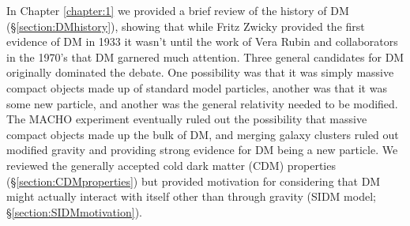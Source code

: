 In Chapter \ref{chapter:1} we provided a brief review of the history of DM (\S\ref{section:DMhistory}), showing that while Fritz Zwicky provided the first evidence of DM in 1933 \citep{Zwicky:1933ub} it wasn't until the work of Vera Rubin and collaborators \citep{Rubin:1970gu} in the 1970's that DM garnered much attention.
Three general candidates for DM originally dominated the debate.
One possibility was that it was simply massive compact objects made up of standard model particles, another was that it was some new particle, and another was the general relativity needed to be modified.
The MACHO experiment \citep{Alcock:2000bw} eventually ruled out the possibility that massive compact objects made up the bulk of DM, and merging galaxy clusters ruled out modified gravity \citep{Clowe:2006hr} and providing strong evidence for DM being a new particle.
We reviewed the generally accepted cold dark matter (CDM) properties (\S\ref{section:CDMproperties}) but provided motivation for considering that DM might actually interact with itself other than through gravity (SIDM model; \S\ref{section:SIDMmotivation}).
